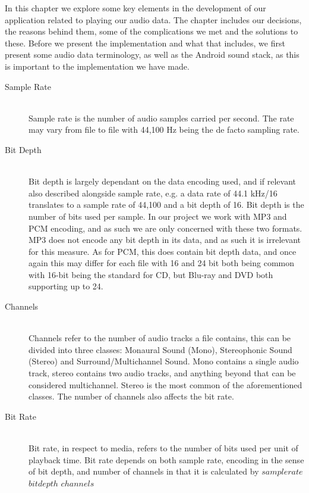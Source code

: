 In this chapter we explore some key elements in the development of our application related to playing our audio data.
The chapter includes our decisions, the reasons behind them, some of the complications we met and the solutions to these.
Before we present the implementation and what that includes, we first present some audio data terminology, as well as the Android sound stack, as this is important to the implementation we have made.
\begin{description}
    \item [Sample Rate] \cite{sample_rate_std} \hfill \\
    Sample rate is the number of audio samples carried per second.
    The rate may vary from file to file with 44,100 Hz being the de facto sampling rate.
    \item [Bit Depth] \cite{bit_depth} \hfill \\
    Bit depth is largely dependant on the data encoding used, and if relevant also described alongside sample rate, e.g. a data rate of 44.1 kHz/16 translates to a sample rate of 44,100 and a bit depth of 16.
    Bit depth is the number of bits used per sample.
    In our project we work with MP3 and PCM encoding, and as such we are only concerned with these two formats.
    MP3 does not encode any bit depth in its data, and as such it is irrelevant for this measure.
    As for PCM, this does contain bit depth data, and once again this may differ for each file with 16 and 24 bit both being common with 16-bit being the standard for CD, but Blu-ray and DVD both supporting up to 24.
    \item [Channels] \cite{channels} \hfill \\
    Channels refer to the number of audio tracks a file contains, this can be divided into three classes: Monaural Sound (Mono), Stereophonic Sound (Stereo) and Surround/Multichannel Sound.
    Mono contains a single audio track, stereo contains two audio tracks, and anything beyond that can be considered multichannel.
    Stereo is the most common of the aforementioned classes.
    The number of channels also affects the bit rate.
    \item [Bit Rate] \cite{bit_rate} \hfill \\ 
    Bit rate, in respect to media, refers to the number of bits used per unit of playback time.
    Bit rate depends on both sample rate, encoding in the sense of bit depth, and number of channels in that it is calculated by $sample rate$ \times $bit depth$ \times $channels$
\end{description}

